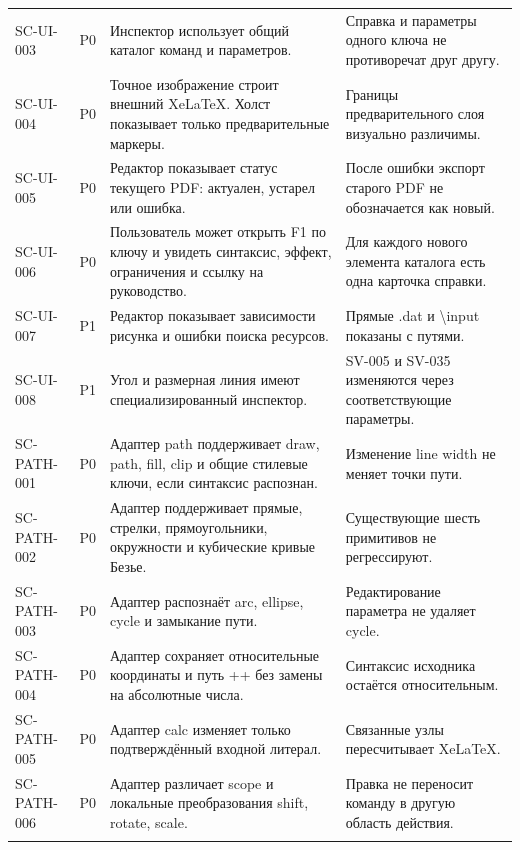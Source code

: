 \documentclass[11pt,a4paper,oneside]{scrreprt}
\begin{document}
\begin{longtable}{@{}>{\raggedright\arraybackslash}p{2.35cm}>{\raggedright\arraybackslash}p{0.75cm}>{\raggedright\arraybackslash}p{6.35cm}>{\raggedright\arraybackslash}p{5.2cm}@{}}
\footnotesize SC-UI-003 & P0 & Инспектор использует общий каталог команд и параметров. & Справка и параметры одного ключа не противоречат друг другу. \\ \addlinespace[2pt]
\footnotesize SC-UI-004 & P0 & Точное изображение строит внешний XeLaTeX. Холст показывает только предварительные маркеры. & Границы предварительного слоя визуально различимы. \\ \addlinespace[2pt]
\footnotesize SC-UI-005 & P0 & Редактор показывает статус текущего PDF: актуален, устарел или ошибка. & После ошибки экспорт старого PDF не обозначается как новый. \\ \addlinespace[2pt]
\footnotesize SC-UI-006 & P0 & Пользователь может открыть F1 по ключу и увидеть синтаксис, эффект, ограничения и ссылку на руководство. & Для каждого нового элемента каталога есть одна карточка справки. \\ \addlinespace[2pt]
\footnotesize SC-UI-007 & P1 & Редактор показывает зависимости рисунка и ошибки поиска ресурсов. & Прямые .dat и \textbackslash{}input показаны с путями. \\ \addlinespace[2pt]
\footnotesize SC-UI-008 & P1 & Угол и размерная линия имеют специализированный инспектор. & SV-005 и SV-035 изменяются через соответствующие параметры. \\ \addlinespace[2pt]
\footnotesize SC-PATH-001 & P0 & Адаптер path поддерживает draw, path, fill, clip и общие стилевые ключи, если синтаксис распознан. & Изменение line width не меняет точки пути. \\ \addlinespace[2pt]
\footnotesize SC-PATH-002 & P0 & Адаптер поддерживает прямые, стрелки, прямоугольники, окружности и кубические кривые Безье. & Существующие шесть примитивов не регрессируют. \\ \addlinespace[2pt]
\footnotesize SC-PATH-003 & P0 & Адаптер распознаёт arc, ellipse, cycle и замыкание пути. & Редактирование параметра не удаляет cycle. \\ \addlinespace[2pt]
\footnotesize SC-PATH-004 & P0 & Адаптер сохраняет относительные координаты и путь ++ без замены на абсолютные числа. & Синтаксис исходника остаётся относительным. \\ \addlinespace[2pt]
\footnotesize SC-PATH-005 & P0 & Адаптер calc изменяет только подтверждённый входной литерал. & Связанные узлы пересчитывает XeLaTeX. \\ \addlinespace[2pt]
\footnotesize SC-PATH-006 & P0 & Адаптер различает scope и локальные преобразования shift, rotate, scale. & Правка не переносит команду в другую область действия. \\ \addlinespace[2pt]

\end{longtable}
\end{document}
